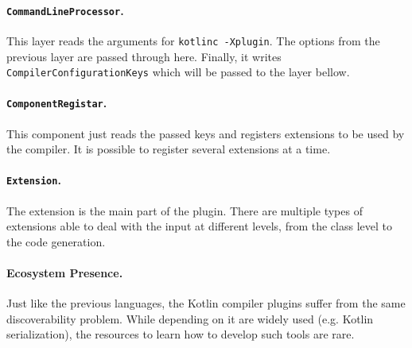 \paragraph{\texttt{CommandLineProcessor}.}
This layer reads the arguments for \texttt{kotlinc -Xplugin}.
The options from the previous layer are passed through here.
Finally, it writes \texttt{CompilerConfigurationKeys} which will be passed to the layer bellow.

\paragraph{\texttt{ComponentRegistar}.}
This component just reads the passed keys and registers extensions to be used by the compiler.
It is possible to register several extensions at a time.

\paragraph{\texttt{Extension}.}
The extension is the main part of the plugin.
There are multiple types of extensions able to deal with the input at different levels,
from the class level to the code generation.

\paragraph{Ecosystem Presence.}
Just like the previous languages, the Kotlin compiler plugins suffer from the same discoverability problem.
While depending on it are widely used (e.g. Kotlin serialization),
the resources to learn how to develop such tools are rare.

